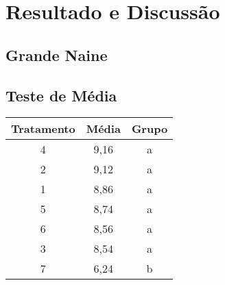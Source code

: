 \chapter{Resultado e Discussão}
\section{Grande Naine}

\section{Teste de Média}
  
 
\begin{table}[htb]
 	\center
 	\footnotesize
	 	\begin{tabular}{|c|c|c|}
 		\hline
 		\textbf{Tratamento} & \textbf{Média}  & \textbf{Grupo}\\
 		\hline
 		4 & 9,16 & a \\
 		\hline
 		2 & 9,12 & a \\
		\hline
 		1 & 8,86 & a \\
		\hline
 		5 & 8,74 & a \\
		\hline
 		6 & 8,56  & a \\
		\hline
 		3 & 8,54  & a \\
		\hline
 		7 & 6,24   & b \\
		\hline
		
 \end{tabular}
\end{table}